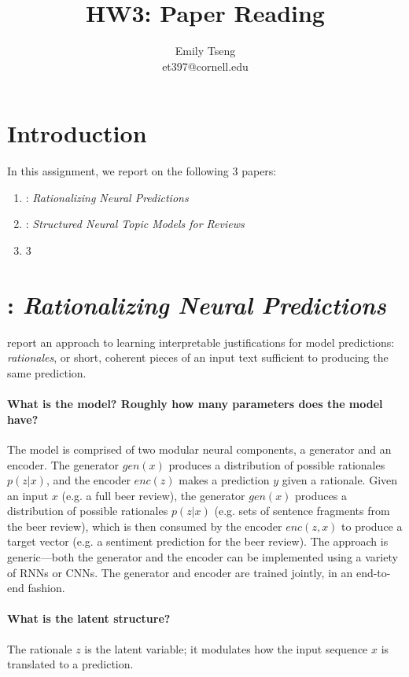 \documentclass[11pt]{article}
\title{HW3: Paper Reading}
\author{Emily Tseng \\ et397@cornell.edu }
\begin{document}
\maketitle{}
\section{Introduction}

In this assignment, we report on the following 3 papers:
\begin{enumerate}
  \item \cite{lei2016rationalizing}: \textit{Rationalizing Neural Predictions}
  \item \cite{esmaeili2018structured}: \textit{Structured Neural Topic Models for Reviews}
  \item 3
\end{enumerate}

\section{\cite{lei2016rationalizing}: \textit{Rationalizing Neural Predictions}}

\cite{lei2016rationalizing} report an approach to learning interpretable justifications for model predictions: \textit{rationales}, or short, coherent pieces of an input text sufficient to producing the same prediction.

\paragraph{What is the model? Roughly how many parameters does the model have?} The model is comprised of two modular neural components, a generator and an encoder. The generator $gen(x)$ produces a distribution of possible rationales $p(z|x)$, and the encoder $enc(z)$ makes a prediction $y$ given a rationale. Given an input $x$ (e.g. a full beer review), the generator $gen(x)$ produces a distribution of possible rationales $p(z|x)$ (e.g. sets of sentence fragments from the beer review), which is then consumed by the encoder $enc(z,x)$ to produce a target vector (e.g. a sentiment prediction for the beer review). The approach is generic---both the generator and the encoder can be implemented using a variety of RNNs or CNNs. The generator and encoder are trained jointly, in an end-to-end fashion.

\paragraph{What is the latent structure?} The rationale $z$ is the latent variable; it modulates how the input sequence $x$ is translated to a prediction.
\end{document}
